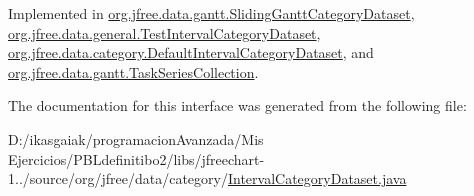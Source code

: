 Implemented in \mbox{\hyperlink{classorg_1_1jfree_1_1data_1_1gantt_1_1_sliding_gantt_category_dataset_a64e5005f6d459a1a2a11d9bcc4e1b058}{org.\+jfree.\+data.\+gantt.\+Sliding\+Gantt\+Category\+Dataset}}, \mbox{\hyperlink{classorg_1_1jfree_1_1data_1_1general_1_1_test_interval_category_dataset_ae3ea72c7a63af5350adc3eb94ac6d006}{org.\+jfree.\+data.\+general.\+Test\+Interval\+Category\+Dataset}}, \mbox{\hyperlink{classorg_1_1jfree_1_1data_1_1category_1_1_default_interval_category_dataset_a3176b53014d159af5ca98190d4ce27ee}{org.\+jfree.\+data.\+category.\+Default\+Interval\+Category\+Dataset}}, and \mbox{\hyperlink{classorg_1_1jfree_1_1data_1_1gantt_1_1_task_series_collection_a2751e6bff5ed9e14360182d2c6c5a4bf}{org.\+jfree.\+data.\+gantt.\+Task\+Series\+Collection}}.



The documentation for this interface was generated from the following file\+:\begin{DoxyCompactItemize}
\item 
D\+:/ikasgaiak/programacion\+Avanzada/\+Mis Ejercicios/\+P\+B\+Ldefinitibo2/libs/jfreechart-\/1../source/org/jfree/data/category/\mbox{\hyperlink{_interval_category_dataset_8java}{Interval\+Category\+Dataset.\+java}}\end{DoxyCompactItemize}
